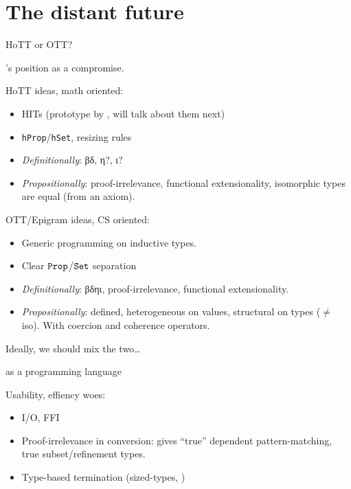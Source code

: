 \section{The distant future}

\begin{subsecframe}{HoTT or OTT?}

  \Coq's position as a compromise.

  HoTT ideas, math oriented:
  \begin{itemize}
  \item HITs (prototype by ,  will talk about them next)
  \item \texttt{hProp}/\texttt{hSet}, resizing rules
  \item \alert{\emph{Definitionally}}: βδ, η?, ι? 
  \item \alert{\emph{Propositionally}}: proof-irrelevance, functional extensionality,
    isomorphic types are equal (from an axiom).
  \end{itemize}
  
  OTT/Epigram ideas, CS oriented:
  \begin{itemize}
  \item Generic programming on inductive types.
  \item Clear $\texttt{Prop}$/$\texttt{Set}$ separation
  \item \alert{\emph{Definitionally}}: βδηι, proof-irrelevance, functional
    extensionality.
  \item \alert{\emph{Propositionally}}: defined, heterogeneous on
    values, structural on types ($\neq$ iso). 
    With coercion and coherence operators.
  \end{itemize}

  Ideally, we should mix the two\dots
\end{subsecframe}

\begin{subsecframe}{\Coq as a programming language}

  Usability, effiency woes:
  \begin{itemize}
  \item I/O, FFI
  \item Proof-irrelevance in conversion: gives ``true'' dependent
    pattern-matching, true subset/refinement types.
  \item Type-based termination (sized-types, )
  \end{itemize}
\end{subsecframe}



